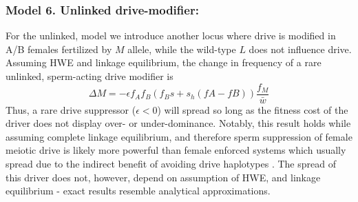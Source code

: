 \documentclass[12pt,letterpaper]{article}
\newcommand{\gc}[1]{{ \color{red} #1}}
\begin{document}
\subsubsection*{Model 6. Unlinked drive-modifier:}
For the unlinked, model we introduce another locus where drive is modified in A/B females fertilized by $M$ allele, 
	while the wild-type $L$ does not influence drive. 
Assuming HWE and linkage equilibrium, the change in frequency of a rare unlinked, sperm-acting drive modifier is 
\begin{equation} \Delta M =-\epsilon f_A f_B (f_B s + s_h (fA - fB) ) \frac{f_M}{\bar{w}}  \label{unlinked} \end{equation}
Thus, a rare drive suppressor ($\epsilon<0$) will spread so long as  the fitness cost of the driver does not display over- or under-dominance. 
Notably, this result holds while assuming complete linkage equilibrium, and therefore sperm suppression of female meiotic drive is likely more powerful than female enforced systems which usually spread due to the indirect benefit of avoiding drive haplotypes \citep[e.g. ][]{Brandvain2012}.  
The spread of this driver does not, however, depend on assumption of HWE, and linkage equilibrium - exact results resemble analytical approximations. 
\end{document}
